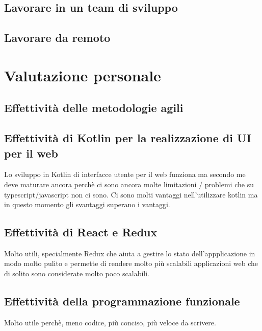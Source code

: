 \subsection{Lavorare in un team di sviluppo}
\subsection{Lavorare da remoto}

\section{Valutazione personale}
\subsection{Effettività delle metodologie agili}
\subsection{Effettività di Kotlin per la realizzazione di UI per il web}
Lo sviluppo in Kotlin di interfacce utente per il web funziona ma secondo me deve maturare ancora perchè ci sono ancora molte limitazioni / problemi che su typescript/javascript non ci sono. Ci sono molti vantaggi nell'utilizzare kotlin ma in questo momento gli svantaggi superano i vantaggi.
\subsection{Effettività di React e Redux}
Molto utili, specialmente Redux che aiuta a gestire lo stato dell'appplicazione in modo molto pulito e permette di rendere molto più scalabili applicazioni web che di solito sono considerate molto poco scalabili.
\subsection{Effettività della programmazione funzionale}
Molto utile perchè, meno codice, più conciso, più veloce da scrivere.